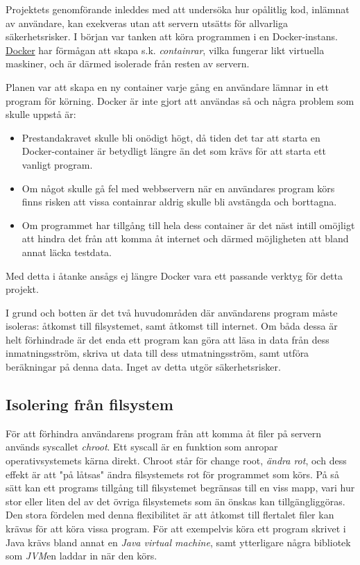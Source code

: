 \documentclass{article}
\begin{document}
Projektets genomförande inleddes med att undersöka hur opålitlig kod, inlämnat
av användare, kan exekveras utan att servern utsätts för allvarliga
säkerhetsrisker. I början var tanken att köra programmen i en Docker-instans.
\href{https://www.docker.com}{Docker} har förmågan att skapa s.k.
\textit{containrar}, vilka fungerar likt virtuella maskiner, och är därmed
isolerade från resten av servern.

Planen var att skapa en ny container varje gång en användare lämnar in ett
program för körning. Docker är inte gjort att användas så och några problem som
skulle uppstå är:
\begin{itemize}
	\item Prestandakravet skulle bli onödigt högt, då tiden det tar att starta
		en Docker-container är betydligt längre än det som krävs för att starta
		ett vanligt program.
	\item Om något skulle gå fel med webbservern när en användares program körs
		finns risken att vissa containrar aldrig skulle bli avstängda och
		borttagna.
	\item Om programmet har tillgång till hela dess container är det näst
		intill omöjligt att hindra det från att komma åt internet och därmed
		möjligheten att bland annat läcka testdata.
\end{itemize}
Med detta i åtanke ansågs ej längre Docker vara ett passande verktyg för detta
projekt.

I grund och botten är det två huvudområden där användarens program måste
isoleras: åtkomst till filsystemet, samt åtkomst till internet. Om båda dessa är
helt förhindrade är det enda ett program kan göra att läsa in data från dess
inmatningsström, skriva ut data till dess utmatningsström, samt utföra
beräkningar på denna data. Inget av detta utgör säkerhetsrisker.

\subsection{Isolering från filsystem}

För att förhindra användarens program från att komma åt filer på servern används
syscallet \textit{chroot}. Ett syscall är en funktion som anropar
operativsystemets kärna direkt. Chroot står för change root,
\textit{ändra rot}, och dess effekt är att "på låtsas" ändra filsystemets rot
för programmet som körs. På så sätt kan ett programs tillgång till filsystemet
begränsas till en viss mapp, vari hur stor eller liten del av det övriga
filsystemets som än önskas kan tillgängliggöras. Den stora fördelen med denna
flexibilitet är att åtkomst till flertalet filer kan krävas för att köra vissa
program. För att exempelvis köra ett program skrivet i Java krävs bland annat en
\textit{Java virtual machine}, samt ytterligare några bibliotek som
\textit{JVM}en laddar in när den körs.
\end{document}
